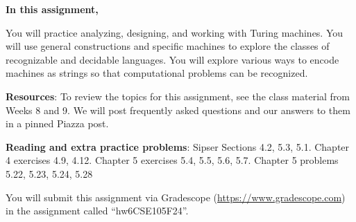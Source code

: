 \maketitle
\thispagestyle{fancy}

{\bf In this assignment,}

You will  practice analyzing, designing, and working with Turing machines.
You will use general constructions and specific machines to explore the classes 
of recognizable and decidable languages. 
You will explore various ways to encode machines as strings so that 
computational problems can be recognized.

{\bf Resources}: To review the topics 
for this assignment, see the class material from Weeks 8 and 9.
We will post frequently asked questions and our answers to them in a 
pinned Piazza post. 

{\bf Reading and extra practice problems}:  
Sipser Sections 4.2, 5.3, 5.1.
Chapter 4 exercises 4.9, 4.12.
Chapter 5 exercises 5.4, 5.5, 5.6, 5.7. 
Chapter 5 problems 5.22, 5.23, 5.24, 5.28

\instructions

You will submit this assignment via Gradescope
(\href{https://www.gradescope.com}{https://www.gradescope.com}) 
in the assignment called ``hw6CSE105F24''.


